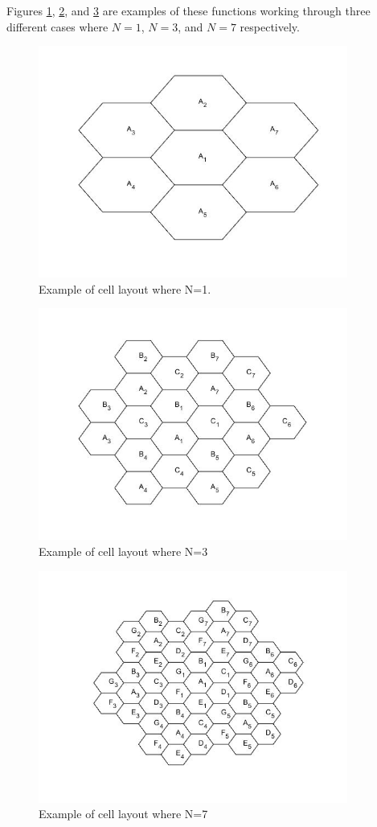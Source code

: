 \documentclass{article}
\begin{document}
Figures \ref{N1}, \ref{N3}, and \ref{N7} are examples of these functions working through three different cases where \(N=1\), \(N=3\), and \(N=7\) respectively. 

\begin{figure}[h]
\centerline{\includegraphics[width=4in]{latex/images/N1.jpg}}
\caption{Example of cell layout where N=1.}
\label{N1}
\end{figure}

\begin{figure}[h]
\centerline{\includegraphics[width=4in]{latex/images/N3.jpg}}
\caption{Example of cell layout where N=3}
\label{N3}
\end{figure}

\begin{figure}[h]
\centerline{\includegraphics[width=4in]{latex/images/N7.jpg}}
\caption{Example of cell layout where N=7}
\label{N7}
\end{figure}
\clearpage
\end{document}
